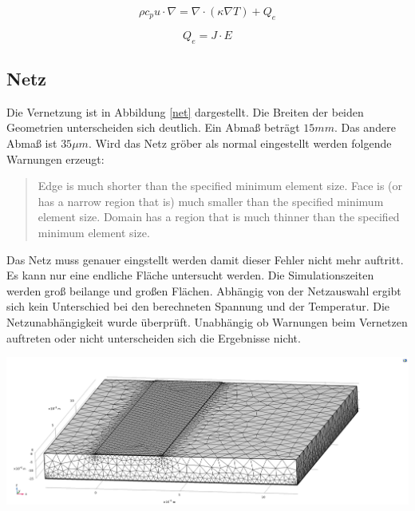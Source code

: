 \documentclass[10pt,a4paper,oneside,abstracton]{scrartcl}
\newenvironment{Figure}
  {\par\medskip\noindent\minipage{\linewidth}}
  {\endminipage\par\medskip}
\begin{document}
\begin{multicols}{2}
	\begin{equation}
		\rho c_p u \cdot \nabla = \nabla \cdot (\kappa \nabla T)+ Q_e
		\label{Super_Multi1}
		\end{equation}

		\begin{equation}
			Q_e = J \cdot E
			\label{Super_Multi2}
			\end{equation}



\subsection{Netz}
Die Vernetzung ist in Abbildung \ref*{net} dargestellt.
Die Breiten der beiden Geometrien unterscheiden sich deutlich. 
\newline
Ein Abmaß beträgt $ 15mm $. Das andere Abmaß ist $ 35 \mu m$.  
\newline
Wird das Netz gröber als normal eingestellt werden folgende Warnungen erzeugt: 
\begin{quote}
Edge is much shorter than the specified minimum element size.
\newline
Face is (or has a narrow region that is) much smaller than the specified minimum element size.
\newline
Domain has a region that is much thinner than the specified minimum element size.
\end{quote}
\noindent
Das Netz muss genauer eingstellt werden damit dieser Fehler nicht mehr auftritt. 
\newline
Es kann nur eine endliche Fläche untersucht werden.
Die Simulationszeiten werden groß beilange und großen Flächen.
\newline
Abhängig von der Netzauswahl ergibt sich kein Unterschied bei den berechneten Spannung und der Temperatur. 
Die Netzunabhängigkeit wurde überprüft. 
\newline
Unabhängig ob Warnungen beim Vernetzen auftreten oder nicht unterscheiden sich die Ergebnisse nicht.

\begin{Figure}
	\includegraphics[width=\textwidth]{Bilder/net.png}
	\label{net}
\end{Figure}


\end{multicols}
\end{document}
